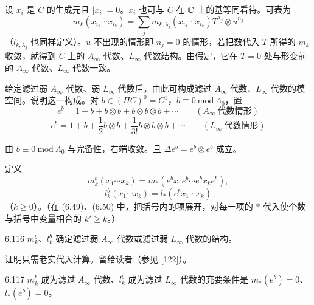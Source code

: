 设 $x_i$ 是 $C$ 的生成元且 $|x_i|=0$。$x_i$ 也可与 $\overline C$ 在 $\mathbb{C}$ 上的基等同看待。可表为
\begin{equation}
  m_k(x_{i_1}\cdots x_{i_k})=\sum_jm_{k,\lambda_j}(x_{i_1}\cdots x_{i_k})T^{\lambda_j}\otimes u^{n_j} \tag{6.46}
\end{equation}
（$l_{k,\lambda_j}$ 也同样定义）。$u$ 不出现的情形即 $n_j=0$ 的情形，若把数代入 $T$ 所得的 $m_k$ 收敛，就得到 $\overline C$ 上的 $A_{\infty}$ 代数、$L_{\infty}$ 代数结构。由假定，它在 $T=0$ 处与形变前的 $A_{\infty}$ 代数、$L_{\infty}$ 代数一致。

给定滤过弱 $A_{\infty}$ 代数、弱 $L_{\infty}$ 代数后，由此可构成滤过 $A_{\infty}$ 代数、$L_{\infty}$ 代数的模空间。说明这一构成。对 $b\in(\Pi C)^0=C^1$，$b\equiv0\ \mathrm{mod}\ \Lambda_0$，置
\begin{equation}
  e^b=1+b+b\otimes b+b\otimes b\otimes b+\cdots\qquad (A_{\infty}\ \text{代数情形}) \tag{6.47}
\end{equation}
\begin{equation}
  e^b=1+b+\frac{1}{2}b\otimes b+\frac{1}{3!}b\otimes b\otimes b+\cdots\qquad (L_{\infty}\ \text{代数情形}) \tag{6.48}
\end{equation}

由 $b\equiv0\ \mathrm{mod}\ \Lambda_0$ 与完备性，右端收敛。且 $\Delta e^b=e^b\otimes e^b$ 成立。

定义
\begin{equation}
  m_k^b(x_1\cdots x_k)=m_*(e^bx_1e^b\cdots e^bx_ke^b), \tag{6.49}
\end{equation}
\begin{equation}
  l_k^b(x_1\cdots x_k)=l_*(e^bx_1\cdots x_k) \tag{6.50}
\end{equation}
（$k\ge0$）。（在 (6.49)、(6.50) 中，把括号内的项展开，对每一项的 $*$ 代入使个数与括号中变量相合的 $k'\ge k$。）


\begin{proposition}{6.116}
  $m_k^b$、$l_k^b$ 确定滤过弱 $A_{\infty}$ 代数或滤过弱 $L_{\infty}$ 代数的结构。
\end{proposition}

证明只需老实代入计算。留给读者（参见 [122]）。

\begin{proposition}{6.117}
  $m_k^b$ 成为滤过 $A_{\infty}$ 代数、$l_k^b$ 成为滤过 $L_{\infty}$ 代数的充要条件是 $m_*(e^b)=0$、$l_*(e^b)=0$。
\end{proposition}

